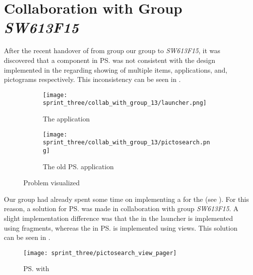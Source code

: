 
\section{Collaboration with Group \emph{SW613F15}}
\label{sec:collaboration_with_group_sw613f15}
After the recent handover of \gc from group our group to \emph{SW613F15}, it was discovered that a component in \ps was not consistent with the design implemented in the \launcher regarding showing of multiple items, applications, and, pictograms respectively. This inconsistency can be seen in .

\begin{figure}[!htbp]
    \centering

    \begin{subfigure}[t]{0.75\textwidth}
        \texttt{[image: sprint\_three/collab\_with\_group\_13/launcher.png]}
        \caption{The \launcher application}
        \label{fig:collab_with_group_13_launhcer}
        \vspace*{1cm}
    \end{subfigure}
    \hfill
    \begin{subfigure}[t]{0.75\textwidth}
        \texttt{[image: sprint\_three/collab\_with\_group\_13/pictosearch.png]}
        \caption{The old \ps application}
        \label{fig:collab_with_group_13_pictosearch}
    \end{subfigure}
    
    \caption{Problem visualized}
    \label{fig:collab_with_group_13}
\end{figure}

Our group had already spent some time on implementing a  for the \launcher (see ). For this reason, a solution for \ps was made in collaboration with group \emph{SW613F15}. A slight implementation difference was that the  in the launcher is implemented using fragments, whereas the  in \ps is implemented using views. This solution can be seen in . 

\begin{figure}[!htbp]
    \centering
    \texttt{[image: sprint\_three/pictosearch\_view\_pager]}
    \caption{\ps with }
    \label{fig:pictosearch_view_pager}
\end{figure}

